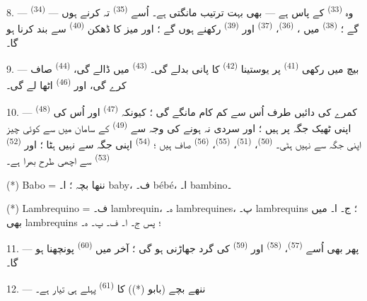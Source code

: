 \VUsaut{5.0mm}
\VUsaut{3.0mm}

8. ---  \textsuperscript{(34)} — وہ
 \textsuperscript{(33)} کے پاس ہے — بھی بہت ترتیب
مانگتی ہے۔ اُسے  \textsuperscript{(35)} تہ کرنے
ہوں گے ؛  \textsuperscript{(38)} میں
،  \textsuperscript{(36)}،
 \textsuperscript{(37)} اور 
\textsuperscript{(39)} رکھنے ہوں گے ؛ اور میز کا ڈھکن
 \textsuperscript{(40)} سے بند کرنا ہو گا۔

9. --- بیچ میں رکھی  \textsuperscript{(41)}
پر یوستینا  \textsuperscript{(42)} کا پانی بدلے گی۔
  \textsuperscript{(43)} میں ڈالے گی،
 \textsuperscript{(44)} صاف کرے گی، اور
 \textsuperscript{(46)} اٹھا لے گی۔

10. --- کمرے کی دائیں طرف اُس سے کم کام مانگے گی ؛ کیونکہ
 \textsuperscript{(47)} اور اُس کی
 \textsuperscript{(48)} اپنی ٹھیک جگہ پر ہیں ؛ اور سردی نہ
ہونے کی وجہ سے  \textsuperscript{(49)} کے سامان میں سے
کوئی چیز اپنی جگہ سے نہیں ہٹی۔ 
\textsuperscript{(50)}،  \textsuperscript{(51)}،
 \textsuperscript{(55)}، 
\textsuperscript{(56)} صاف ہیں ؛ 
\textsuperscript{(54)} اپنی جگہ سے نہیں ہٹا ؛ اور  \textsuperscript{(52)}  \textsuperscript{(53)} سے
اچھی طرح بھرا ہے۔

(*) Babo = ننھا بچہ ؛ ا۔ baby، ف۔ bébé، ا۔ bambino۔

(*) Lambrequino = ف۔ lambrequin، ہ۔ lambrequines، پ۔ lambrequins ؛
ج۔ ا۔ میں بھی lambrequins ؛ پس ج۔ ا۔ ف۔ پ۔ ہ۔

11. --- پھر بھی اُسے  \textsuperscript{(57)}،
 \textsuperscript{(58)} اور  \textsuperscript{(59)} کی گرد جھاڑنی ہو گی ؛ آخر میں
 \textsuperscript{(60)} پونچھنا ہو گا۔

12. --- ننھے بچے (بابو (*)) کا  \textsuperscript{(61)}
پہلے ہی تیار ہے۔

\VUsaut{5.0mm}
\VUsaut{3.0mm}

